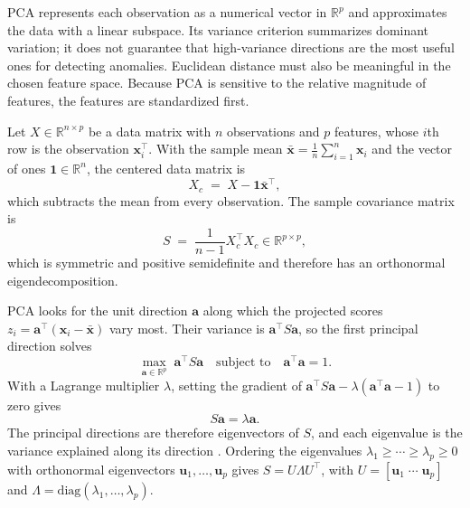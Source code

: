 \documentclass[12pt]{report}
\begin{document}
PCA represents each observation as a numerical vector in $\mathbb{R}^p$ and approximates the
data with a linear subspace. Its variance criterion summarizes dominant variation; it does not
guarantee that high-variance directions are the most useful ones for detecting anomalies.
Euclidean distance must also be meaningful in the chosen feature space. Because PCA
is sensitive to the relative magnitude of features, the features are standardized first.

Let $X \in \mathbb{R}^{n\times p}$ be a data matrix with $n$ observations and $p$ features, whose
$i$th row is the observation $\mathbf{x}_i^\top$. With the sample mean
$\bar{\mathbf{x}} = \frac{1}{n}\sum_{i=1}^n \mathbf{x}_i$ and the vector of ones
$\mathbf{1}\in\mathbb{R}^n$, the centered data matrix is
\[
X_c \;=\; X - \mathbf{1}\bar{\mathbf{x}}^\top,
\]
which subtracts the mean from every observation. The sample covariance matrix is
\begin{equation}
S \;=\; \frac{1}{n-1}X_c^\top X_c \in \mathbb{R}^{p\times p},
\label{eq:cov-matrix}
\end{equation}
which is symmetric and positive semidefinite and therefore has an orthonormal eigendecomposition.

PCA looks for the unit direction $\mathbf{a}$ along which the projected scores
$z_i = \mathbf{a}^\top(\mathbf{x}_i - \bar{\mathbf{x}})$ vary most. Their variance is
$\mathbf{a}^\top S\mathbf{a}$, so the first principal direction solves
\begin{equation}
\max_{\mathbf{a}\in\mathbb{R}^p}\; \mathbf{a}^\top S \mathbf{a} \quad \text{subject to}\quad \mathbf{a}^\top \mathbf{a} = 1.
\label{eq:pca-opt}
\end{equation}
With a Lagrange multiplier $\lambda$, setting the gradient of
$\mathbf{a}^\top S\mathbf{a} - \lambda(\mathbf{a}^\top\mathbf{a} - 1)$ to zero gives
\begin{equation}
S\mathbf{a} = \lambda \mathbf{a}.
\label{eq:eig}
\end{equation}
The principal directions are therefore eigenvectors of $S$, and each eigenvalue is the variance
explained along its direction \cite{hotelling1933,jolliffe1986}. Ordering the eigenvalues
$\lambda_1 \ge \cdots \ge \lambda_p \ge 0$ with orthonormal eigenvectors $\mathbf{u}_1,\dots,\mathbf{u}_p$
gives $S = U\Lambda U^\top$, with $U = [\mathbf{u}_1\;\cdots\;\mathbf{u}_p]$ and
$\Lambda = \mathrm{diag}(\lambda_1,\dots,\lambda_p)$.
\end{document}
